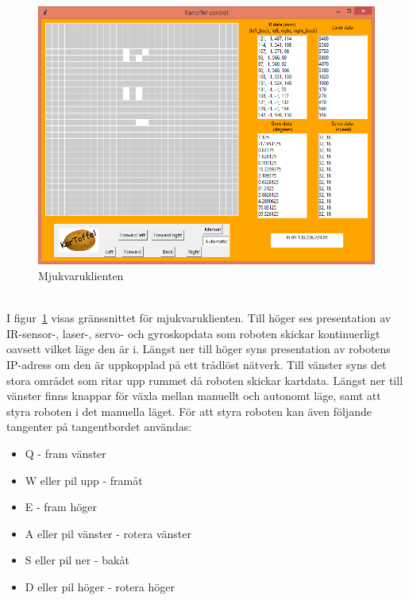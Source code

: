 \documentclass{article}
\begin{document}
\begin{figure}[H]
\centering
\includegraphics[scale=0.55]{client1}
\caption{Mjukvaruklienten}
\label{fig:client1}
\end{figure}
\ \\
I figur~\ref{fig:client1} visas gränssnittet för mjukvaruklienten. Till höger ses presentation av IR-sensor-, laser-, servo- och gyroskopdata som roboten skickar kontinuerligt oavsett vilket läge den är i. Längst ner till höger syns presentation av robotens IP-adress om den är uppkopplad på ett trådlöst nätverk. 
Till vänster syns det stora området som ritar upp rummet då roboten skickar kartdata. Längst ner till vänster finns knappar för växla mellan manuellt och autonomt läge, samt att styra roboten i det manuella läget. För att styra roboten kan även följande tangenter på tangentbordet användas:
\begin{itemize}
    \item Q - fram vänster
    \item W eller pil upp - framåt
    \item E - fram höger
    \item A eller pil vänster - rotera vänster
    \item S eller pil ner - bakåt
    \item D eller pil höger - rotera höger
\end{itemize}

\clearpage
\end{document}
